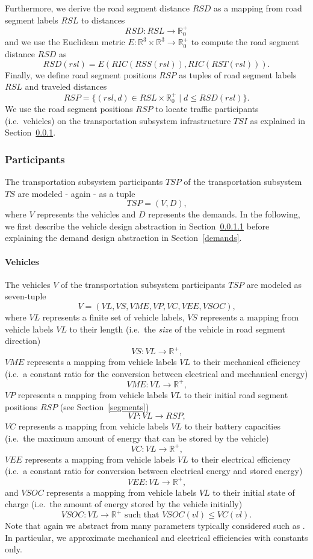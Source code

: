 Furthermore, we derive the road segment distance $RSD$ as a mapping from road segment labels $RSL$ to distances
\[
	RSD: RSL \rightarrow \mathbb{R}_0^+
\]
and we use the Euclidean metric $E: \mathbb{R}^3 \times \mathbb{R}^3 \rightarrow \mathbb{R}_0^+$ to compute the road segment distance $RSD$ as
\[
	RSD(rsl) = E(RIC(RSS(rsl)), RIC(RST(rsl))) \textrm{.}
\]
Finally, we define road segment positions $RSP$ as tuples of road segment labels $RSL$ and traveled distances
\[
	RSP = \{(rsl, d) \in RSL \times \mathbb{R}_0^+ \mid d \leq RSD(rsl)\} \textrm{.}
\]
We use the road segment positions $RSP$ to locate traffic participants (i.e.\ vehicles) on the transportation subsystem infrastructure $TSI$ as explained in Section~\ref{participants}.

\subsubsection{Participants}
\label{participants}

The transportation subsystem participants $TSP$ of the transportation subsystem $TS$ are modeled - again - as a tuple
\[
	TSP = (V, D) \textrm{,}
\]
where $V$ represents the vehicles and $D$ represents the demands. In the following, we first describe the vehicle design abstraction in Section~\ref{vehicles} before explaining the demand design abstraction in Section~\ref{demands}.

\paragraph{Vehicles}
\label{vehicles}

The vehicles $V$ of the transportation subsystem participants $TSP$ are modeled as seven-tuple
\[
	V = (VL, VS, VME, VP, VC, VEE, VSOC) \textrm{,}
\]
where $VL$ represents a finite set of vehicle labels, $VS$ represents a mapping from vehicle labels $VL$ to their length (i.e.\ the \textit{size} of the vehicle in road segment direction)
\[
	VS : VL \rightarrow \mathbb{R}^+ \textrm{,}
\]
$VME$ represents a mapping from vehicle labels $VL$ to their mechanical efficiency (i.e.\ a constant ratio for the conversion between electrical and mechanical energy)
\[
	VME : VL \rightarrow \mathbb{R}^+ \textrm{,}
\]
$VP$ represents a mapping from vehicle labels $VL$ to their initial road segment positions $RSP$ (see Section~\ref{segments})
\[
	VP : VL \rightarrow RSP \textrm{,}
\]
$VC$ represents a mapping from vehicle labels $VL$ to their battery capacities (i.e.\ the maximum amount of energy that can be stored by the vehicle)
\[
	VC : VL \rightarrow \mathbb{R}^+ \textrm{,}
\]
$VEE$ represents a mapping from vehicle labels $VL$ to their electrical efficiency (i.e.\ a constant ratio for conversion between electrical energy and stored energy)
\[
	VEE : VL \rightarrow \mathbb{R}^+ \textrm{,}
\]
and $VSOC$ represents a mapping from vehicle labels $VL$ to their initial state of charge (i.e.\ the amount of energy stored by the vehicle initially)
\[
	VSOC : VL \rightarrow \mathbb{R}^+ \textrm{ such that } VSOC(vl) \leq VC(vl) \textrm{.}
\]
Note that again we abstract from many parameters typically considered such as . In particular, we approximate mechanical and electrical efficiencies with constants only.

